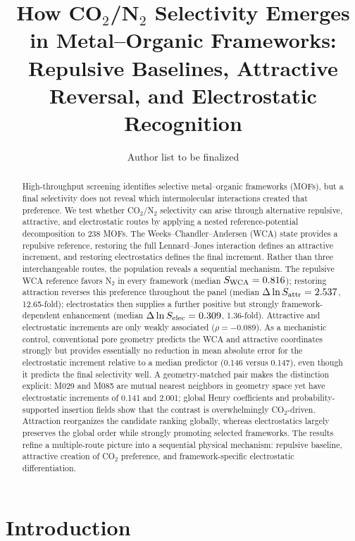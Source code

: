 \documentclass[11pt,a4paper]{article}
\title{How CO$_2$/N$_2$ Selectivity Emerges in Metal--Organic Frameworks:\\Repulsive Baselines, Attractive Reversal, and Electrostatic Recognition}
\author{Author list to be finalized}
\date{}
\begin{document}
\maketitle

\begin{abstract}
High-throughput screening identifies selective metal--organic frameworks (MOFs), but a final selectivity does not reveal which intermolecular interactions created that preference. We test whether CO$_2$/N$_2$ selectivity can arise through alternative repulsive, attractive, and electrostatic routes by applying a nested reference-potential decomposition to 238 MOFs. The Weeks--Chandler--Andersen (WCA) state provides a repulsive reference, restoring the full Lennard--Jones interaction defines an attractive increment, and restoring electrostatics defines the final increment. Rather than three interchangeable routes, the population reveals a sequential mechanism. The repulsive WCA reference favors N$_2$ in every framework (median $S_{\rm WCA}=0.816$); restoring attraction reverses this preference throughout the panel (median $\Delta\ln S_{\rm attr}=2.537$, 12.65-fold); electrostatics then supplies a further positive but strongly framework-dependent enhancement (median $\Delta\ln S_{\rm elec}=0.309$, 1.36-fold). Attractive and electrostatic increments are only weakly associated ($\rho=-0.089$). As a mechanistic control, conventional pore geometry predicts the WCA and attractive coordinates strongly but provides essentially no reduction in mean absolute error for the electrostatic increment relative to a median predictor (0.146 versus 0.147), even though it predicts the final selectivity well. A geometry-matched pair makes the distinction explicit: M029 and M085 are mutual nearest neighbors in geometry space yet have electrostatic increments of 0.141 and 2.001; global Henry coefficients and probability-supported insertion fields show that the contrast is overwhelmingly CO$_2$-driven. Attraction reorganizes the candidate ranking globally, whereas electrostatics largely preserves the global order while strongly promoting selected frameworks. The results refine a multiple-route picture into a sequential physical mechanism: repulsive baseline, attractive creation of CO$_2$ preference, and framework-specific electrostatic differentiation.
\end{abstract}

\section{Introduction}
\end{document}
